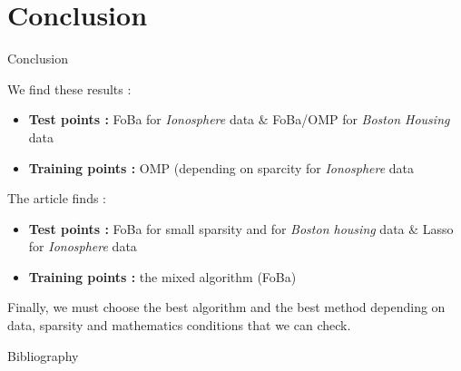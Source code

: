 \documentclass[unknownkeysallowed]{beamer}
\begin{document}
\section{Conclusion}
\label{sec:conclusion}


\begin{frame}{Conclusion}

\vspace{0.5cm}
We find these results :
\begin{itemize}
    \item \textbf{Test points :} FoBa for \textit{Ionosphere} data $\&$ FoBa/OMP for \textit{Boston Housing} data
    \item \textbf{Training points :} OMP (depending on sparcity for \textit{Ionosphere} data
\end{itemize}
\vspace{0.2cm}
The article finds : 
\begin{itemize}
    \item \textbf{Test points :} FoBa for small sparsity and for \textit{Boston housing} data $\&$ Lasso for \textit{Ionosphere} data
    \item \textbf{Training points :} the mixed algorithm (FoBa)
\end{itemize}
\vspace{0.5cm}
Finally, we must choose the best algorithm and the best method depending on data, sparsity and mathematics conditions that we can check.

\end{frame}

\begin{frame}{Bibliography}
\nocite{*}
\printbibliography
\end{frame}
\end{document}
